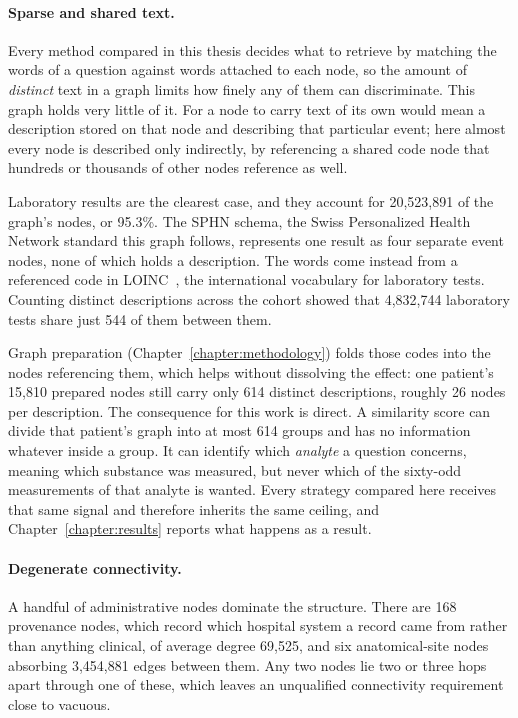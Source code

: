\paragraph{Sparse and shared text.} Every method compared in this thesis decides
what to retrieve by matching the words of a question against words attached to
each node, so the amount of \emph{distinct} text in a graph limits how finely any
of them can discriminate. This graph holds very little of it. For a node to carry
text of its own would mean a description stored on that node and describing that
particular event; here almost every node is described only indirectly, by
referencing a shared code node that hundreds or thousands of other nodes
reference as well.

Laboratory results are the clearest case, and they account for 20{,}523{,}891 of
the graph's nodes, or 95.3\%. The SPHN schema, the Swiss Personalized Health
Network standard this graph follows, represents one result as four separate event
nodes, none of which holds a description. The words come instead from a
referenced code in LOINC~\cite{loinc}, the international vocabulary for
laboratory tests. Counting distinct descriptions across the cohort showed that
4{,}832{,}744 laboratory tests share just 544 of them between them.

Graph preparation (Chapter~\ref{chapter:methodology}) folds those codes into the
nodes referencing them, which helps without dissolving the effect: one patient's
15{,}810 prepared nodes still carry only 614 distinct descriptions, roughly 26
nodes per description. The consequence for this work is direct. A similarity
score can divide that patient's graph into at most 614 groups and has no
information whatever inside a group. It can identify which \emph{analyte} a
question concerns, meaning which substance was measured, but never which of the
sixty-odd measurements of that analyte is wanted. Every strategy compared here
receives that same signal and therefore inherits the same ceiling, and
Chapter~\ref{chapter:results} reports what happens as a result.

\paragraph{Degenerate connectivity.} A handful of administrative nodes dominate
the structure. There are 168 provenance nodes, which record which hospital system
a record came from rather than anything clinical, of average degree 69{,}525, and
six anatomical-site nodes absorbing 3{,}454{,}881 edges between them. Any two
nodes lie two or three hops apart through one of these, which leaves an
unqualified connectivity requirement close to vacuous.

